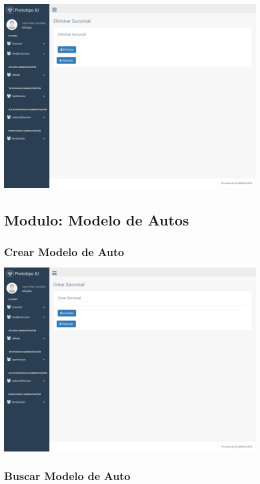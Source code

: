 \includegraphics[width=\linewidth]{ui-prototype/SucursalServices/EliminarSucursalPage.png}


\section{Modulo: Modelo de Autos}

\subsection{Crear Modelo de Auto}

\includegraphics[width=\linewidth]{ui-prototype/SucursalServices/CrearSucursalPage.png}

\subsection{Buscar Modelo de Auto}


